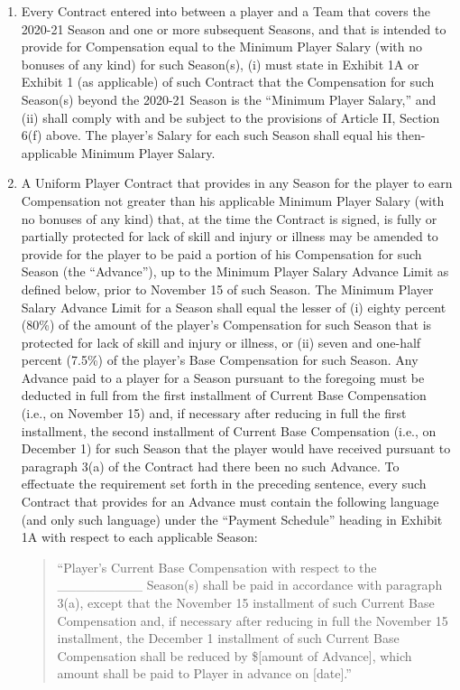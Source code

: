 \documentclass[
]{book}
\begin{document}
\begin{enumerate}
\item
  Every Contract entered into between a player and a Team that covers the 2020-21 Season and one or more subsequent Seasons, and that is intended to provide for Compensation equal to the Minimum Player Salary (with no bonuses of any kind) for such Season(s), (i) must state in Exhibit 1A or Exhibit 1 (as applicable) of such Contract that the Compensation for such Season(s) beyond the 2020-21 Season is the ``Minimum Player Salary,'' and (ii) shall comply with and be subject to the provisions of Article II, Section 6(f) above. The player's Salary for each such Season shall equal his then-applicable Minimum Player Salary.
\item
  A Uniform Player Contract that provides in any Season for the player to earn Compensation not greater than his applicable Minimum Player Salary (with no bonuses of any kind) that, at the time the Contract is signed, is fully or partially protected for lack of skill and injury or illness may be amended to provide for the player to be paid a portion of his Compensation for such Season (the ``Advance''), up to the Minimum Player Salary Advance Limit as defined below, prior to November 15 of such Season. The Minimum Player Salary Advance Limit for a Season shall equal the lesser of (i) eighty percent (80\%) of the amount of the player's Compensation for such Season that is protected for lack of skill and injury or illness, or (ii) seven and one-half percent (7.5\%) of the player's Base Compensation for such Season. Any Advance paid to a player for a Season pursuant to the foregoing must be deducted in full from the first installment of Current Base Compensation (i.e., on November 15) and, if necessary after reducing in full the first installment, the second installment of Current Base Compensation (i.e., on December 1) for such Season that the player would have received pursuant to paragraph 3(a) of the Contract had there been no such Advance. To effectuate the requirement set forth in the preceding sentence, every such Contract that provides for an Advance must contain the following language (and only such language) under the ``Payment Schedule'' heading in Exhibit 1A with respect to each applicable Season:

  \begin{quote}
  ``Player's Current Base Compensation with respect to the \_\_\_\_\_\_\_\_\_ Season(s) shall be paid in accordance with paragraph 3(a), except that the November 15 installment of such Current Base Compensation and, if necessary after reducing in full the November 15 installment, the December 1 installment of such Current Base Compensation shall be reduced by \${[}amount of Advance{]}, which amount shall be paid to Player in advance on {[}date{]}.''
  \end{quote}
\end{enumerate}
\end{document}
